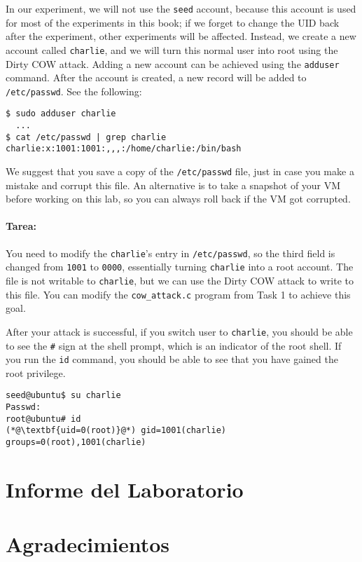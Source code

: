 In our experiment, we will not use the \texttt{seed} account, because this account is used
for most of the experiments in this book; if we forget to change the UID back after the
experiment, other experiments will be affected.  Instead, we create a new account called
\texttt{charlie}, and we will turn this normal user into root using
the Dirty COW attack.
Adding a new account can be achieved using the \texttt{adduser} command.
After the account is created, a new
record will be added to \texttt{/etc/passwd}.  See
the following:

\begin{lstlisting}
$ sudo adduser charlie
  ...
$ cat /etc/passwd | grep charlie
charlie:x:1001:1001:,,,:/home/charlie:/bin/bash
\end{lstlisting}

We suggest that you save a copy of the \texttt{/etc/passwd} file, just in case you 
make a mistake and corrupt this file. An alternative is to take a snapshot of your VM before
working on this lab, so you can always roll back if the VM got corrupted. 



\paragraph{Tarea:} You need to modify the \texttt{charlie}'s entry in
\texttt{/etc/passwd}, so the third field is changed from \texttt{1001} to 
\texttt{0000}, essentially turning \texttt{charlie} into a root account. 
The file is not writable to \texttt{charlie}, but we can use 
the Dirty COW attack to write to this file. You can  
modify the \texttt{cow\_attack.c} program from Task 1 to achieve 
this goal. 

After your attack is successful, if you switch user to \texttt{charlie}, you should be able to see the 
\texttt{\#} sign at the shell prompt, which is an indicator of the root shell. If you 
run the \texttt{id} command, you should be able to see that you have gained the root privilege. 

\begin{lstlisting}
seed@ubuntu$ su charlie
Passwd: 
root@ubuntu# id
(*@\textbf{uid=0(root)}@*) gid=1001(charlie) groups=0(root),1001(charlie)
\end{lstlisting}
 


\section{Informe del Laboratorio}




\section*{Agradecimientos}






